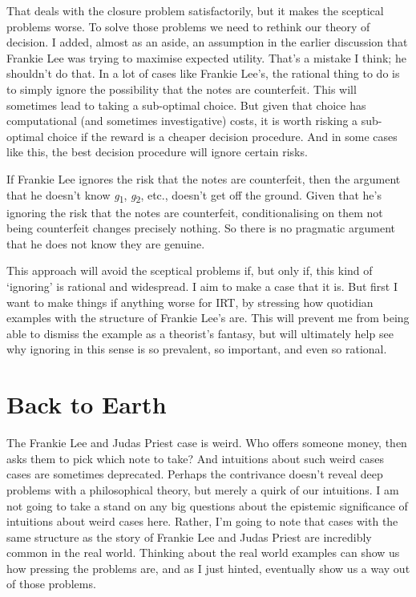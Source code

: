 \documentclass[
  11pt,
]{book}
\begin{document}
That deals with the closure problem satisfactorily, but it makes the sceptical problems worse. To solve those problems we need to rethink our theory of decision. I added, almost as an aside, an assumption in the earlier discussion that Frankie Lee was trying to maximise expected utility. That's a mistake I think; he shouldn't do that. In a lot of cases like Frankie Lee's, the rational thing to do is to simply ignore the possibility that the notes are counterfeit. This will sometimes lead to taking a sub-optimal choice. But given that choice has computational (and sometimes investigative) costs, it is worth risking a sub-optimal choice if the reward is a cheaper decision procedure. And in some cases like this, the best decision procedure will ignore certain risks.

If Frankie Lee ignores the risk that the notes are counterfeit, then the argument that he doesn't know \emph{g}\textsubscript{1}, \emph{g}\textsubscript{2}, etc., doesn't get off the ground. Given that he's ignoring the risk that the notes are counterfeit, conditionalising on them not being counterfeit changes precisely nothing. So there is no pragmatic argument that he does not know they are genuine.

This approach will avoid the sceptical problems if, but only if, this kind of `ignoring' is rational and widespread. I aim to make a case that it is. But first I want to make things if anything worse for IRT, by stressing how quotidian examples with the structure of Frankie Lee's are. This will prevent me from being able to dismiss the example as a theorist's fantasy, but will ultimately help see why ignoring in this sense is so prevalent, so important, and even so rational.

\hypertarget{backearth}{%
\section{Back to Earth}\label{backearth}}

The Frankie Lee and Judas Priest case is weird. Who offers someone money, then asks them to pick which note to take? And intuitions about such weird cases cases are sometimes deprecated. Perhaps the contrivance doesn't reveal deep problems with a philosophical theory, but merely a quirk of our intuitions. I am not going to take a stand on any big questions about the epistemic significance of intuitions about weird cases here. Rather, I'm going to note that cases with the same structure as the story of Frankie Lee and Judas Priest are incredibly common in the real world. Thinking about the real world examples can show us how pressing the problems are, and as I just hinted, eventually show us a way out of those problems.
\end{document}
